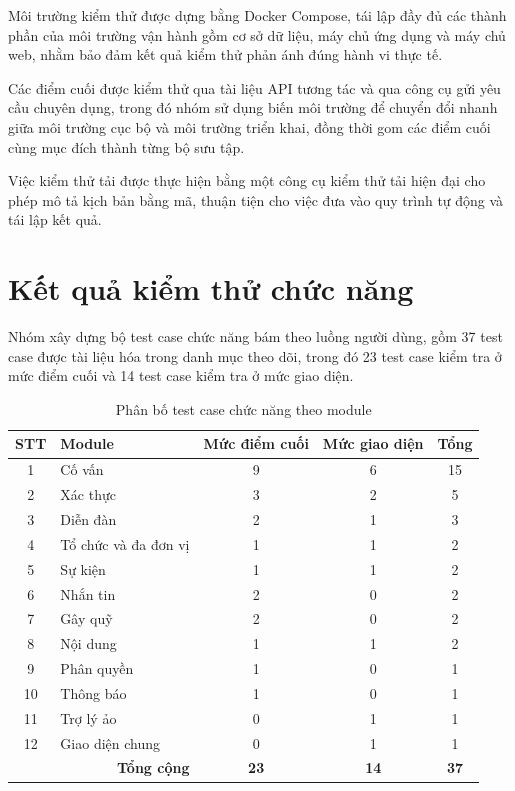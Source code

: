 \documentclass[12pt,a4paper,oneside]{report}
\begin{document}
Môi trường kiểm thử được dựng bằng Docker Compose, tái lập đầy đủ các thành phần của môi trường vận hành gồm cơ sở dữ liệu, máy chủ ứng dụng và máy chủ web, nhằm bảo đảm kết quả kiểm thử phản ánh đúng hành vi thực tế.

Các điểm cuối được kiểm thử qua tài liệu API tương tác và qua công cụ gửi yêu cầu chuyên dụng, trong đó nhóm sử dụng biến môi trường để chuyển đổi nhanh giữa môi trường cục bộ và môi trường triển khai, đồng thời gom các điểm cuối cùng mục đích thành từng bộ sưu tập.

Việc kiểm thử tải được thực hiện bằng một công cụ kiểm thử tải hiện đại cho phép mô tả kịch bản bằng mã, thuận tiện cho việc đưa vào quy trình tự động và tái lập kết quả.

\section{Kết quả kiểm thử chức năng}

Nhóm xây dựng bộ test case chức năng bám theo luồng người dùng, gồm 37 test case được tài liệu hóa trong danh mục theo dõi, trong đó 23 test case kiểm tra ở mức điểm cuối và 14 test case kiểm tra ở mức giao diện.

\renewcommand{\arraystretch}{1.25}
\begin{table}[H]
\centering
\small
\caption{Phân bố test case chức năng theo module}
\label{tab:testcases}
\begin{tabular}{|c|>{\raggedright\arraybackslash}p{5.6cm}|c|c|c|}
\hline
\textbf{STT} & \textbf{Module} & \textbf{Mức điểm cuối} & \textbf{Mức giao diện} & \textbf{Tổng} \\ \hline
1 & Cố vấn & 9 & 6 & 15 \\ \hline
2 & Xác thực & 3 & 2 & 5 \\ \hline
3 & Diễn đàn & 2 & 1 & 3 \\ \hline
4 & Tổ chức và đa đơn vị & 1 & 1 & 2 \\ \hline
5 & Sự kiện & 1 & 1 & 2 \\ \hline
6 & Nhắn tin & 2 & 0 & 2 \\ \hline
7 & Gây quỹ & 2 & 0 & 2 \\ \hline
8 & Nội dung & 1 & 1 & 2 \\ \hline
9 & Phân quyền & 1 & 0 & 1 \\ \hline
10 & Thông báo & 1 & 0 & 1 \\ \hline
11 & Trợ lý ảo & 0 & 1 & 1 \\ \hline
12 & Giao diện chung & 0 & 1 & 1 \\ \hline
\multicolumn{2}{|r|}{\textbf{Tổng cộng}} & \textbf{23} & \textbf{14} & \textbf{37} \\ \hline
\end{tabular}
\end{table}
\renewcommand{\arraystretch}{1}
\end{document}
